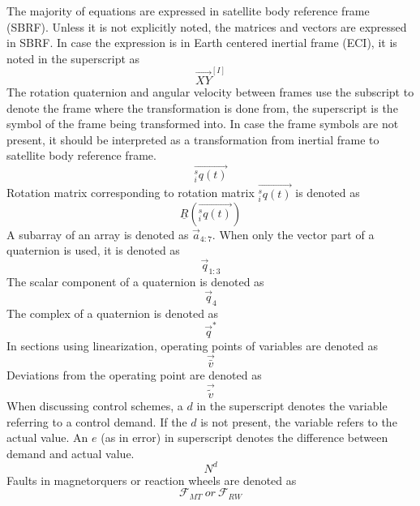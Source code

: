 The majority of equations are expressed in satellite body reference frame (SBRF). Unless it is not explicitly noted, the matrices and vectors are expressed in SBRF. In case the expression is in Earth centered inertial frame (ECI), it is noted in the superscript as 
\begin{equation*}
\vec{XY}^{[I]}
\end{equation*}
The rotation quaternion and angular velocity between frames use the subscript to denote the frame where the transformation is done from, the superscript is the symbol of the frame being transformed into. In case the frame symbols are not present, it should be interpreted as a transformation from inertial frame to satellite body reference frame.
\begin{equation*}
\vec{^s_i q(t)}
\end{equation*}
Rotation matrix corresponding to rotation matrix $\vec{^s_i q(t)}$ is denoted as
\begin{equation*}
\underline{R}(\vec{^s_i q(t)})
\end{equation*}
A subarray of an array is denoted as $\vec{a}_{4:7}$. When only the vector part of a quaternion is used, it is denoted as 
\begin{equation*}
\vec{q}_{1:3}
\end{equation*}
The scalar component of a quaternion is denoted as 
\begin{equation*}
\vec{q}_{4}
\end{equation*}
The complex of a quaternion is denoted as
\begin{equation*}
\vec q^\ast
\end{equation*}
In sections using linearization, operating points of variables are denoted as
\begin{equation*}
\vec{\bar{v}}
\end{equation*}
Deviations from the operating point are denoted as
\begin{equation*}
\vec{\tilde{v}}
\end{equation*}
When discussing control schemes, a $d$ in the superscript denotes the variable referring to a control demand. If the $d$ is not present, the variable refers to the actual value. An $e$ (as in error) in superscript denotes the difference between demand and actual value.
\begin{equation*}
N^d
\end{equation*}
Faults in magnetorquers or reaction wheels are denoted as
\begin{equation*}
\mathcal{F}_{MT} \ or  \  \mathcal{F}_{RW}
\end{equation*}

